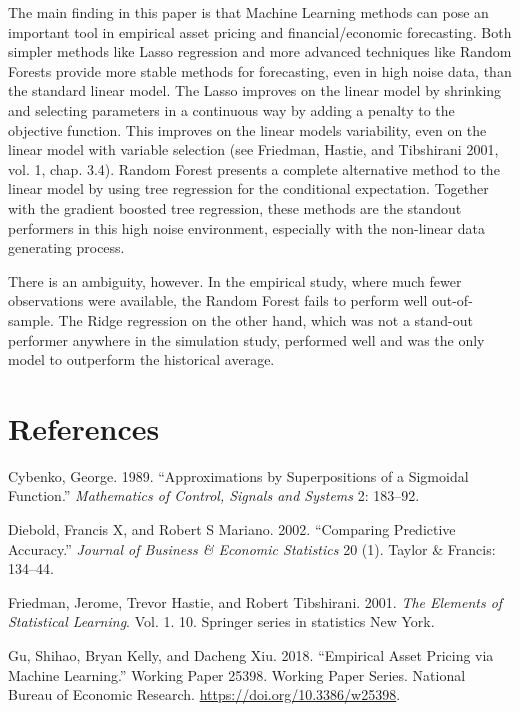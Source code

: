 \documentclass[11pt]{article}
\begin{document}
The main finding in this paper is that Machine Learning methods can pose
an important tool in empirical asset pricing and financial/economic
forecasting. Both simpler methods like Lasso regression and more
advanced techniques like Random Forests provide more stable methods for
forecasting, even in high noise data, than the standard linear model. The Lasso improves on the linear model by shrinking and selecting parameters in a continuous way by
adding a penalty to the objective function. This improves on the linear models
variability, even on the linear model with variable selection (see
Friedman, Hastie, and Tibshirani 2001, vol. 1, chap. 3.4). Random
Forest presents a complete alternative method to the linear model by
using tree regression for the conditional expectation. Together with the
gradient boosted tree regression, these methods are the standout
performers in this high noise environment, especially with the
non-linear data generating process.

There is an ambiguity, however. In the empirical study, where much fewer observations were available, the Random Forest fails to perform well out-of-sample. The Ridge regression on the other hand, which was not a stand-out performer anywhere in the simulation study, performed well and was the only model to outperform the historical average.

\hypertarget{references}{%
\section{References}\label{references}}

\hypertarget{refs}{}
\leavevmode\hypertarget{ref-cybenko1989approximations}{}%
Cybenko, George. 1989. ``Approximations by Superpositions of a Sigmoidal
Function.'' \emph{Mathematics of Control, Signals and Systems} 2:
183--92.

\leavevmode\hypertarget{ref-diebold2002comparing}{}%
Diebold, Francis X, and Robert S Mariano. 2002. ``Comparing Predictive
Accuracy.'' \emph{Journal of Business \& Economic Statistics} 20 (1).
Taylor \& Francis: 134--44.

\leavevmode\hypertarget{ref-friedman2001elements}{}%
Friedman, Jerome, Trevor Hastie, and Robert Tibshirani. 2001. \emph{The
Elements of Statistical Learning}. Vol. 1. 10. Springer series in
statistics New York.

\leavevmode\hypertarget{ref-NBERw25398}{}%
Gu, Shihao, Bryan Kelly, and Dacheng Xiu. 2018. ``Empirical Asset
Pricing via Machine Learning.'' Working Paper 25398. Working Paper
Series. National Bureau of Economic Research.
\url{https://doi.org/10.3386/w25398}.
\end{document}
